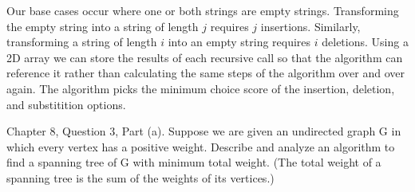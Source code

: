 \documentclass{article}
\begin{document}
\begin{enumerate}
Our base cases occur where one or both strings are empty strings. Transforming the empty string into a string of length $j$ requires $j$ insertions. Similarly, transforming a string of length $i$ into an empty string requires $i$ deletions. Using a 2D array we can store the results of each recursive call so that the algorithm can reference it rather than calculating the same steps of the algorithm over and over again. The algorithm picks the minimum choice score of the insertion, deletion, and substitition options. 

\end{enumerate}


\nextprob{}

Chapter 8, Question 3, Part (a). Suppose we are given an undirected graph G in which every vertex has a positive weight. Describe and analyze an algorithm to find a spanning tree of G with minimum total weight. (The total weight of a spanning tree is the sum
of the weights of its vertices.)
\end{document}
